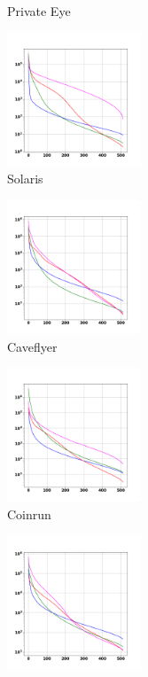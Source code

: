 \documentclass[a4paper,11pt]{elsarticle}
\begin{document}
\begin{figure}[t!]
\begin{subfigure}[b]{0.3\textwidth}
    \caption{Private Eye}
    \label{fig:analysis2d}
  \end{subfigure} 
  \begin{subfigure}[b]{0.3\textwidth}
    \centering
    \includegraphics[width=4cm]{fig/analysis/anal_solaris.png}
    \caption{Solaris}
    \label{fig:analysis2e}   
  \end{subfigure}
    \begin{subfigure}[b]{0.3\textwidth}
    \centering
    \includegraphics[width=4cm]{fig/analysis/anal_caveflyer.png}
    \caption{Caveflyer}
    \label{fig:analysis2f}
  \end{subfigure}
  \begin{subfigure}[b]{0.3\textwidth}
    \centering
    \includegraphics[width=4cm]{fig/analysis/anal_coinrun.png}
    \caption{Coinrun}
    \label{fig:analysis2g}
  \end{subfigure}
  \begin{subfigure}[b]{0.3\textwidth}
    \centering
    \includegraphics[width=4cm]{fig/analysis/anal_jumper.png}

\end{subfigure}
\end{figure}
\end{document}
